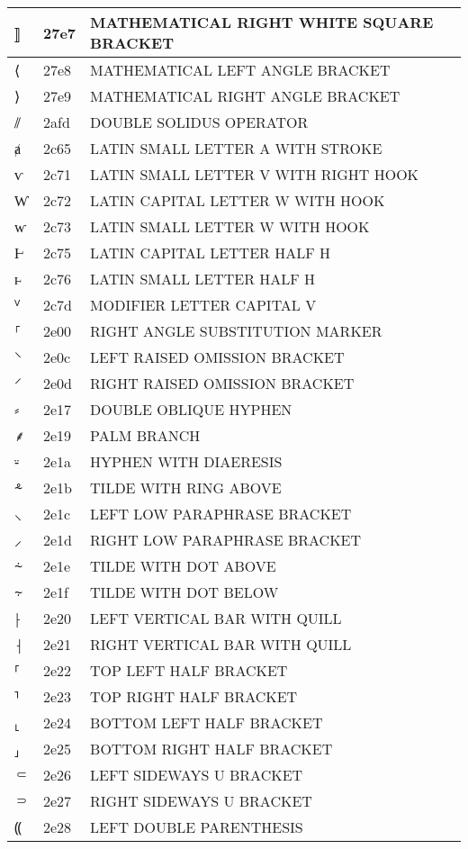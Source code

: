 \documentclass[12pt,letterpaper,openany]{book}
\begin{document}
\begin{center}
\begin{supertabular}{|m{0.25in}|m{0.5in}|m{4in}|}
⟧ & 27e7 & MATHEMATICAL RIGHT WHITE SQUARE BRACKET\\\hline
⟨ & 27e8 & MATHEMATICAL LEFT ANGLE BRACKET\\\hline
⟩ & 27e9 & MATHEMATICAL RIGHT ANGLE BRACKET\\\hline
⫽ & 2afd & DOUBLE SOLIDUS OPERATOR\\\hline
ⱥ & 2c65 & LATIN SMALL LETTER A WITH STROKE\\\hline
ⱱ & 2c71 & LATIN SMALL LETTER V WITH RIGHT HOOK\\\hline
Ⱳ & 2c72 & LATIN CAPITAL LETTER W WITH HOOK\\\hline
ⱳ & 2c73 & LATIN SMALL LETTER W WITH HOOK\\\hline
Ⱶ & 2c75 & LATIN CAPITAL LETTER HALF H\\\hline
ⱶ & 2c76 & LATIN SMALL LETTER HALF H\\\hline
ⱽ & 2c7d & MODIFIER LETTER CAPITAL V\\\hline
⸀ & 2e00 & RIGHT ANGLE SUBSTITUTION MARKER\\\hline
⸌ & 2e0c & LEFT RAISED OMISSION BRACKET\\\hline
⸍ & 2e0d & RIGHT RAISED OMISSION BRACKET\\\hline
⸗ & 2e17 & DOUBLE OBLIQUE HYPHEN\\\hline
⸙ & 2e19 & PALM BRANCH\\\hline
⸚ & 2e1a & HYPHEN WITH DIAERESIS\\\hline
⸛ & 2e1b & TILDE WITH RING ABOVE\\\hline
⸜ & 2e1c & LEFT LOW PARAPHRASE BRACKET\\\hline
⸝ & 2e1d & RIGHT LOW PARAPHRASE BRACKET\\\hline
⸞ & 2e1e & TILDE WITH DOT ABOVE\\\hline
⸟ & 2e1f & TILDE WITH DOT BELOW\\\hline
⸠ & 2e20 & LEFT VERTICAL BAR WITH QUILL\\\hline
⸡ & 2e21 & RIGHT VERTICAL BAR WITH QUILL\\\hline
⸢ & 2e22 & TOP LEFT HALF BRACKET\\\hline
⸣ & 2e23 & TOP RIGHT HALF BRACKET\\\hline
⸤ & 2e24 & BOTTOM LEFT HALF BRACKET\\\hline
⸥ & 2e25 & BOTTOM RIGHT HALF BRACKET\\\hline
⸦ & 2e26 & LEFT SIDEWAYS U BRACKET\\\hline
⸧ & 2e27 & RIGHT SIDEWAYS U BRACKET\\\hline
⸨ & 2e28 & LEFT DOUBLE PARENTHESIS\\\hline

\end{supertabular}
\end{center}
\end{document}
